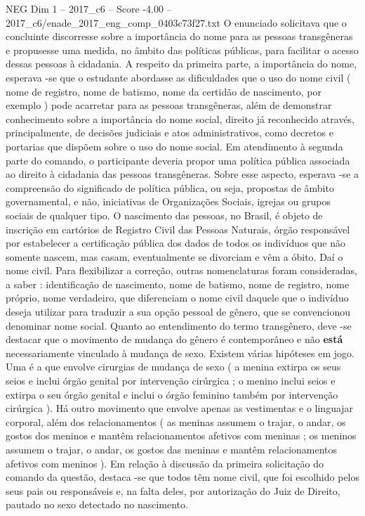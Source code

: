 \begin{textsample}{NEG Dim 1 – 2017\_c6 – Score -4.00 – 2017\_c6/enade\_2017\_eng\_comp\_0403c73f27.txt}
O enunciado solicitava que o concluinte discorresse sobre a importância do nome para as pessoas transgêneras e propusesse uma medida, no âmbito das políticas públicas, para facilitar o acesso dessas pessoas à cidadania.
A respeito da primeira parte, a importância do nome, esperava -se que o estudante abordasse as dificuldades que o uso do nome civil ( nome de registro, nome de batismo, nome da certidão de nascimento, por exemplo ) pode acarretar para as pessoas transgêneras, além de demonstrar conhecimento sobre a importância do nome social, direito já reconhecido através, principalmente, de decisões judiciais e atos administrativos, como decretos e portarias que dispõem sobre o uso do nome social.
Em atendimento à segunda parte do comando, o participante deveria propor uma política pública associada ao direito à cidadania das pessoas transgêneras.
Sobre esse aspecto, esperava -se a compreensão do significado de política pública, ou seja, propostas de âmbito governamental, e não, iniciativas de Organizações Sociais, igrejas ou grupos sociais de qualquer tipo.
O nascimento das pessoas, no Brasil, é objeto de inscrição em cartórios de Registro Civil das Pessoas Naturais, órgão responsável por estabelecer a certificação pública dos dados de todos os indivíduos que não somente nascem, mas casam, eventualmente se divorciam e vêm a óbito.
Daí o nome civil.
Para flexibilizar a correção, outras nomenclaturas foram consideradas, a saber : identificação de nascimento, nome de batismo, nome de registro, nome próprio, nome verdadeiro, que diferenciam o nome civil daquele que o indivíduo deseja utilizar para traduzir a sua opção pessoal de gênero, que se convencionou denominar nome social.
Quanto ao entendimento do termo transgênero, deve -se destacar que o movimento de mudança do gênero é contemporâneo e não \textbf{está} necessariamente vinculado à mudança de sexo.
Existem várias hipóteses em jogo.
Uma é a que envolve cirurgias de mudança de sexo ( a menina extirpa os seus seios e inclui órgão genital por intervenção cirúrgica ; o menino inclui seios e extirpa o seu órgão genital e inclui o órgão feminino também por intervenção cirúrgica ).
Há outro movimento que envolve apenas as vestimentas e o linguajar corporal, além dos relacionamentos ( as meninas assumem o trajar, o andar, os gostos dos meninos e mantêm relacionamentos afetivos com meninas ; os meninos assumem o trajar, o andar, os gostos das meninas e mantêm relacionamentos afetivos com meninos ).
Em relação à discussão da primeira solicitação do comando da questão, destaca -se que todos têm nome civil, que foi escolhido pelos seus pais ou responsáveis e, na falta deles, por autorização do Juiz de Direito, pautado no sexo detectado no nascimento.

\end{textsample}
